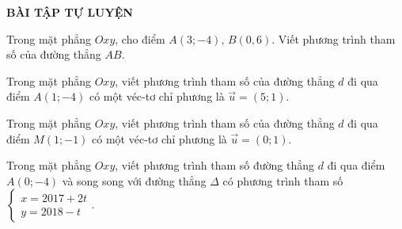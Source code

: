 \begin{center}
\textbf{BÀI TẬP TỰ LUYỆN}
\end{center}
\begin{bt}%
	Trong mặt phẳng $Oxy$, cho điểm $A (3;-4)$, $B(0,6)$. Viết phương trình tham số của đường thẳng $AB$.
\end{bt}
\begin{bt}%
	Trong mặt phẳng $Oxy$, viết phương trình tham số của đường thẳng $d$ đi qua điểm $A(1;-4)$ có một véc-tơ chỉ phương là $\vec{u} =(5;1)$.
\end{bt}
\begin{bt}%
	Trong mặt phẳng $Oxy$, viết phương trình tham số của đường thẳng $d$ đi qua điểm $M(1;-1)$ có một véc-tơ chỉ phương là $\vec{u} =(0;1)$.
\end{bt}
\begin{bt}%
	Trong mặt phẳng $Oxy$, viết phương trình tham số đường thẳng $d$ đi qua điểm $A(0;-4)$ và song song với đường thẳng $\Delta $ có phương trình tham số $\left\{ \begin{array}{l} x = 2017 + 2t \\ y = 2018 - t\end{array} \right.$.
\end{bt}
